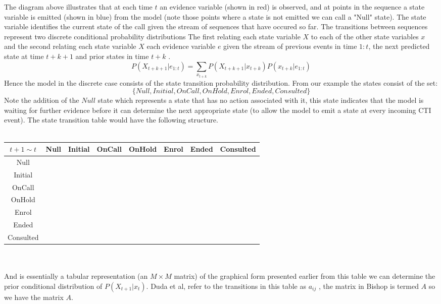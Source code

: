 \documentclass[11pt]{article}
\begin{document}
The diagram above illustrates that at each time $t$ an evidence variable (shown in red) is observed, and at points in the sequence a state variable is emitted (shown in blue) from the model (note those points where a state is not emitted we can call a "Null" state). The state variable identifies the current state of the call given the stream of sequences that have occured so far. The transitions between sequences represent two discrete conditional probability distributions The first relating each state variable $X$ to each of the other state variables $x$ and the second relating each state variable $X$ each evidence variable $e$ given the stream of previous events in time $1:t$, the next predicted state at time $t+k+1$ and prior states in time $t+k$ \cite{mai}.
$$
P(X_{t+k+1}|e_{1:t}) = \sum_{ x_{t+k} } P(X_{t+k+1} | x_{t+k}) P(x_{t+k}|e_{1:t}) 
$$
Hence the model in the discrete case consists of the state transition probability distribution. From our example the states consist of the set: $$\{Null, Initial,OnCall,OnHold, Enrol, Ended, Consulted\}$$
Note the addition of the $Null$ state which represents a state that has no action associated with it, this state indicates that the model is waiting for further evidence before it can determine the next appropriate state (to allow the model to emit a state at every incoming CTI event). The state transition table would have the following structure.\\
\\
\begin{tabular}{|c|c|c|c|c|c|c|c|} 
\hline
$t+1 \sim t$ & Null & Initial & OnCall & OnHold & Enrol & Ended & Consulted \\
\hline
Null & & & & & & & \\
\hline
Initial & & & & & & & \\
\hline
OnCall & & & & & & & \\
\hline
OnHold & & & & & & & \\
\hline
Enrol & & & & & & & \\
\hline 
Ended & & & & & & & \\
\hline
Consulted & & & & & & & \\
\hline 
\end{tabular}
\\
\\
And is essentially a tabular representation (an $M \times M$ matrix) of the graphical form presented earlier from this table we can determine the prior conditional distribution of $P(X_{t+1} | x_{t})$. Duda et al, refer to the transitions in this table as $a_{ij}$ \cite{pc}, the matrix in Bishop is termed $A$ \cite{mlp} so we have the matrix $A$.
\end{document}
